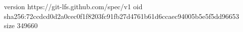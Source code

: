 version https://git-lfs.github.com/spec/v1
oid sha256:72ccdcd0d2a0cec0f1f8203fc91fb27d4761b61d6ccaec94005b5e5f5dd96653
size 349660
